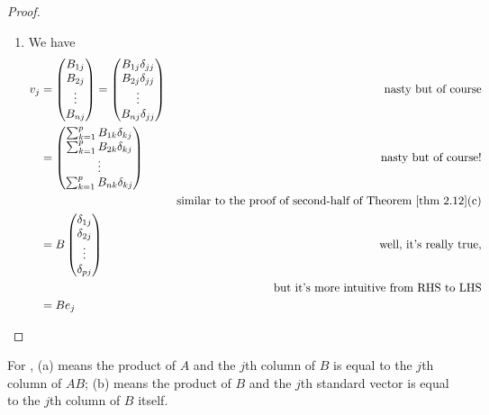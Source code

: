 \begin{proof}
\begin{enumerate}
\item
We have
\begin{align*}
    v_j & = \begin{pmatrix}
            B_{1j} \\
            B_{2j} \\
            \vdots \\
            B_{nj}
        \end{pmatrix}
        = \begin{pmatrix}
            B_{1j} \delta_{jj} \\
            B_{2j} \delta_{jj} \\
            \vdots \\
            B_{nj} \delta_{jj}
        \end{pmatrix} & \text{nasty but of course} \\
        & = \begin{pmatrix}
            \sum_{k = 1}^p B_{1k} \delta_{kj} \\
            \sum_{k = 1}^p B_{2k} \delta_{kj} \\
            \vdots \\
            \sum_{k = 1}^p B_{nk} \delta_{kj}
        \end{pmatrix} & \text{nasty but of course!} \\
        & & \text{similar to the proof of second-half of \THM{2.12}(c)} \\
        & = B \begin{pmatrix}
            \delta_{1j} \\
            \delta_{2j} \\
            \vdots \\
            \delta_{pj} \\
        \end{pmatrix} & \text{well, it's really true,} \\
        & & \text{but it's more intuitive from RHS to LHS} \\
        & = B e_j
\end{align*}
\end{enumerate}
\end{proof}

\begin{remark} \label{remark 2.3.5}
For ,
(a) means the product of \(A\) and the \(j\)th column of \(B\) is equal to the \(j\)th column of \(AB\);
(b) means the product of \(B\) and the \(j\)th standard vector is equal to the \(j\)th column of \(B\) itself.
\end{remark}

